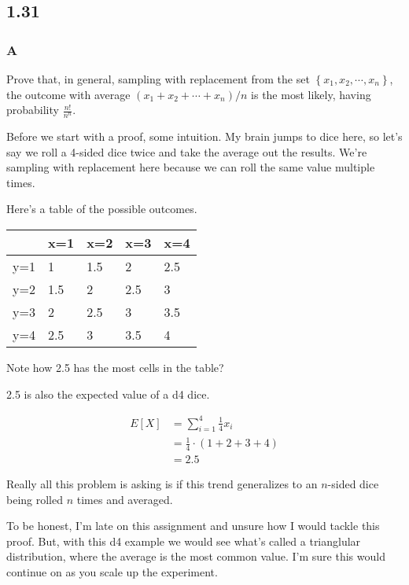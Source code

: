 \subsection*{1.31}

\subsubsection*{A}

Prove that, in general, sampling with replacement from the set $\left\{ x_1, x_2, \cdots, x_n \right\}$, the outcome with average $\left( x_1 + x_2 + \cdots + x_n \right) / n$ is the most likely, having probability $\frac{n!}{n^n}$.

Before we start with a proof, some intuition. My brain jumps to dice here, so let's say we roll a 4-sided dice twice and take the average out the results. We're sampling with replacement here because we can roll the same value multiple times.

Here's a table of the possible outcomes.

\begin{table}[h]
\begin{tabular}{|l|l|l|l|l|}
\hline
    & x=1 & x=2 & x=3 & x=4 \\ \hline
y=1 & 1   & 1.5 & 2   & 2.5 \\ \hline
y=2 & 1.5 & 2   & 2.5 & 3   \\ \hline
y=3 & 2   & 2.5 & 3   & 3.5 \\ \hline
y=4 & 2.5 & 3   & 3.5 & 4   \\ \hline
\end{tabular}
\end{table}

Note how 2.5 has the most cells in the table? 

2.5 is also the expected value of a d4 dice.

\begin{align*}
	E[X] &= \sum_{i=1}^{4} \frac{1}{4} x_i \\
	&= \frac{1}{4} \cdot (1 + 2 + 3 + 4) \\
	&= 2.5
\end{align*}

Really all this problem is asking is if this trend generalizes to an $n$-sided dice being rolled $n$ times and averaged.

To be honest, I'm late on this assignment and unsure how I would tackle this proof. But, with this d4 example we would see what's called a trianglular distribution, where the average is the most common value. I'm sure this would continue on as you scale up the experiment.

